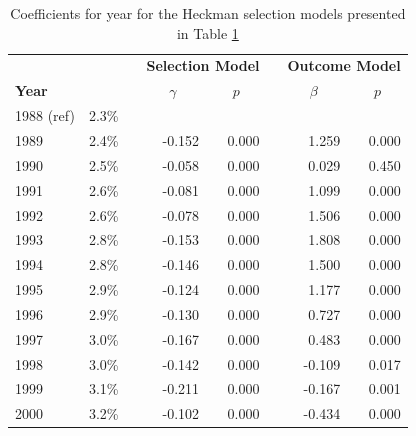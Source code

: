\begin{table}[H]
	\renewcommand{\baselinestretch}{1.1} 
	\small
	\centering
	\caption{{Coefficients for year for the Heckman selection models presented in Table \ref{table:models_2}}}
	\label{table:models_2}
	\begin{tabular}{lrrrrrrr}
		\hline
		&         &  & \multicolumn{2}{r}{\textbf{Selection Model}}              &                      & \multicolumn{2}{r}{\textbf{Outcome Model}}                \\
		\textbf{Year}   &  &  & \multicolumn{1}{c}{$\gamma$} & \multicolumn{1}{c}{$p$} & \multicolumn{1}{c}{} & \multicolumn{1}{c}{$\beta$} & \multicolumn{1}{c}{$p$} \\ \hline
		
		1988 (ref) & 2.3\% &  &                   &                 &  &                  &                \\
		1989       & 2.4\% &  & -0.152            & 0.000           &  & 1.259            & 0.000          \\
		1990       & 2.5\% &  & -0.058            & 0.000           &  & 0.029            & 0.450          \\
		1991       & 2.6\% &  & -0.081            & 0.000           &  & 1.099            & 0.000          \\
		1992       & 2.6\% &  & -0.078            & 0.000           &  & 1.506            & 0.000          \\
		1993       & 2.8\% &  & -0.153            & 0.000           &  & 1.808            & 0.000          \\
		1994       & 2.8\% &  & -0.146            & 0.000           &  & 1.500            & 0.000          \\
		1995       & 2.9\% &  & -0.124            & 0.000           &  & 1.177            & 0.000          \\
		1996       & 2.9\% &  & -0.130            & 0.000           &  & 0.727            & 0.000          \\
		1997       & 3.0\% &  & -0.167            & 0.000           &  & 0.483            & 0.000          \\
		1998       & 3.0\% &  & -0.142            & 0.000           &  & -0.109           & 0.017          \\
		1999       & 3.1\% &  & -0.211            & 0.000           &  & -0.167           & 0.001          \\
		2000       & 3.2\% &  & -0.102            & 0.000           &  & -0.434           & 0.000          \\

\end{tabular}
\end{table}
